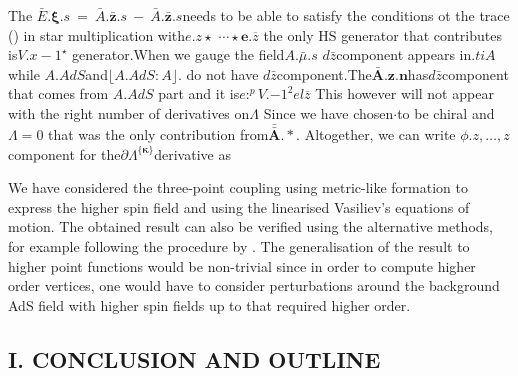 \documentclass{article}
\begin{document}
The $\bar { E } . { \pmb { \xi } . { s } } ~ = ~ \bar { A } . { \pmb { \bar { z } } . { s } } ~ - ~ \bar { A } . { \pmb { \bar { z } } . { s } }$needs to be able to satisfy the
conditions ot the trace () in star multiplication with$e . { z } \star$
$\cdots \star \mathbf { e } . { \overline { z } }$ the only HS generator that contributes is$V . { x - 1 } ^ { \star }$
generator.When we gauge the field$A . { \bar { \mu }. s }$ $d \bar { z }$component
appears in$. { t i A }$ while $A . { A d S }$and$\lfloor A . { A d S : A } \rfloor.$ do not have
$d \bar { z }$component.The$\bar { \mathbf { A } } . { \mathbf { z } . { \mathbf { n } } }$has$d \bar { z }$component that comes
from $A . { A d S }$ part and it is$e : ^ { p } V . { - 1 } ^ { 2 } e l \overline { z }$ This however will
not appear with the right number of derivatives on$\Lambda$
Since we have chosen$\cdot$to be chiral and$\Lambda = 0$ that was
the only contribution from$\bar { \bar { \boldsymbol { A } } } . { * }.$ Altogether, we can write
$\phi . { z, \dots, z }$component for the$\partial \Lambda ^ { \{ \pmb { \kappa } \} }$derivative as


We have considered the three-point coupling using
metric-like formation to express the higher spin field and
using the linearised Vasiliev's equations of motion. The
obtained result can also be verified using the alternative methods, for example following the procedure by .
The generalisation of the result to higher point functions
would be non-trivial since in order to compute higher order vertices, one would have to consider perturbations
around the background AdS field with higher spin fields
up to that required higher order.


\subsection*{I. CONCLUSION AND OUTLINE}
\end{document}
